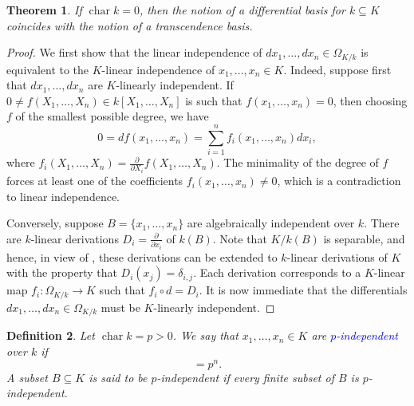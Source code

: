 \documentclass[10pt]{article}
\theoremstyle{thmstyle}
\newtheorem{theorem}{Theorem}[section]
\theoremstyle{defstyle}
\newtheorem{definition}[theorem]{Definition}
\newcommand{\chr}{\operatorname{char}}
\newcommand{\define}[1]{\textcolor{blue}{\textit{#1}}}
\begin{document}
\begin{theorem}
    If $\chr k = 0$, then the notion of a differential basis for $k\subseteq K$ coincides with the notion of a transcendence basis.
\end{theorem}
\begin{proof}
    We first show that the linear independence of $dx_1,\dots,dx_n\in\Omega_{K/k}$ is equivalent to the $K$-linear independence of $x_1,\dots,x_n\in K$. Indeed, suppose first that $dx_1,\dots,dx_n$ are $K$-linearly independent. If $0\ne f(X_1,\dots,X_n)\in k[X_1,\dots,X_n]$ is such that $f(x_1,\dots,x_n) = 0$, then choosing $f$ of the smallest possible degree, we have 
    \begin{equation*}
        0 = df(x_1,\dots,x_n) = \sum_{i = 1}^n f_i(x_1,\dots,x_n) dx_i,
    \end{equation*}
    where $f_i(X_1,\dots,X_n) = \frac{\partial}{\partial X_i}f(X_1,\dots,X_n)$. The minimality of the degree of $f$ forces at least one of the coefficients $f_i(x_1,\dots,x_n)\ne 0$, which is a contradiction to linear independence.

    Conversely, suppose $B = \{x_1,\dots,x_n\}$ are algebraically independent over $k$. There are $k$-linear derivations $D_i = \frac{\partial}{\partial x_i}$ of $k(B)$. Note that $K/k(B)$ is separable, and hence, in view of , these derivations can be extended to $k$-linear derivations of $K$ with the property that $D_i(x_j) = \delta_{i, j}$. Each derivation corresponds to a $K$-linear map $f_i\colon\Omega_{K/k}\to K$ such that $f_i\circ d = D_i$. It is now immediate that the differentials $dx_1,\dots,dx_n\in\Omega_{K/k}$ must be $K$-linearly independent.
\end{proof}

\begin{definition}
    Let $\chr k = p > 0$. We say that $x_1,\dots,x_n\in K$ are \define{$p$-independent} over $k$ if 
    \begin{equation*}
        [K^p(k, x_1,\dots,x_n) : K^p(k)] = p^n.
    \end{equation*}
    A subset $B\subseteq K$ is said to be $p$-independent if every finite subset of $B$ is $p$-independent.
\end{definition}
\end{document}
